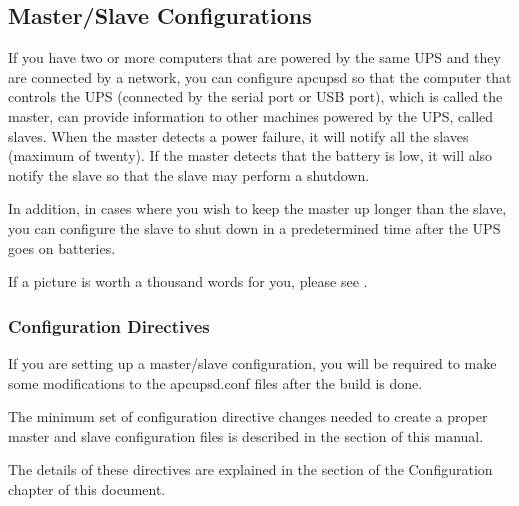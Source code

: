 {{{{{{{{{\label{Master_002fSlave-Configurations}

\subsection*{Master/Slave Configurations}

\label{index-Master_002fSlave-152}
If you have two or more computers that are powered by the same UPS and they
are connected by a network, you can configure apcupsd so that the computer
that controls the UPS (connected by the serial port or USB port), which is
called the master, can provide information to other machines powered by the
UPS, called slaves. When the master detects a power failure, it will notify
all the slaves (maximum of twenty). If the master detects that the battery is
low, it will also notify the slave so that the slave may perform a shutdown.  

In addition, in cases where you wish to keep the master up longer than the
slave, you can configure the slave to shut down in a predetermined time after
the UPS goes on batteries.  

If a picture is worth a thousand words for you, please see 
. 

\label{Configuration-Directives}

\subsubsection*{Configuration Directives}

\label{index-Directives-153}
\label{index-Configuration_002c-Directives-154}
If you are setting up a master/slave configuration, you will be required to
make some modifications to the apcupsd.conf files after the build is done.  

The minimum set of configuration directive changes needed to create a proper
master and slave configuration files is described in the 
 section of
this manual.  

The details of these directives are explained in the 
 section of the
Configuration chapter of this document.  

}}}}}}}}}

